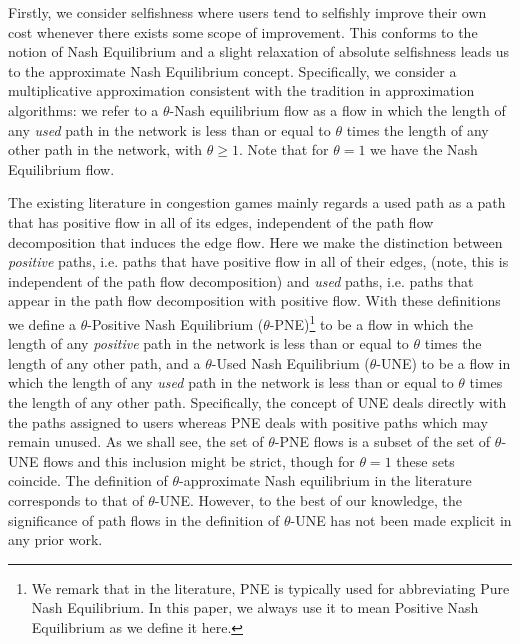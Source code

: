 Firstly, we consider selfishness where users tend to selfishly improve their own cost whenever there exists some scope of improvement.  This conforms to the notion of Nash Equilibrium and a slight relaxation of  absolute selfishness leads us to the approximate Nash Equilibrium concept.  Specifically, we consider a multiplicative approximation consistent with the tradition in approximation algorithms: we refer to a $\theta$-Nash equilibrium flow as a flow in which the length of any {\em used} path in the network is less than or equal to $\theta$ times the length of any other path in the network, with $\theta \geq1$.   Note that for $\theta=1$ we have the Nash Equilibrium flow.

The existing literature in congestion games mainly regards a used path as a path that has positive flow in all of its edges, independent of the path flow decomposition that induces the edge flow. Here we make the distinction between \emph{positive} paths, i.e. paths that have positive flow in all of their edges, (note, this is independent of the path flow decomposition) %
 and \emph{used} paths, i.e. paths that appear in the path flow decomposition with positive flow. With these definitions we define a $\theta$-Positive Nash Equilibrium ($\theta$-PNE)\footnote{We remark that in the literature, PNE is typically used for abbreviating Pure Nash Equilibrium.  In this paper, we always use it to mean Positive Nash Equilibrium as we define it here.} 
 to be a flow in which the length of any {\em positive} path in the network is less than or equal to $\theta$ times the length of any other path, and  a $\theta$-Used Nash Equilibrium ($\theta$-UNE) to be a flow in which the length of any {\em used} path in the network is less than or equal to $\theta$ times the length of any other path. 
Specifically, the concept of UNE deals directly with the paths assigned to users whereas PNE deals with positive paths which may remain unused.  
 As we shall see, the set of $\theta$-PNE flows is a subset of the set of $\theta$-UNE flows and this inclusion might be strict, though for $\theta=1$ these sets coincide. The definition of $\theta$-approximate Nash equilibrium in the literature~\cite{christodoulou2011performance} corresponds to that of $\theta$-UNE. However, to the best of our knowledge, the significance of path flows in the definition of $\theta$-UNE has not been made explicit in any prior work.
 
